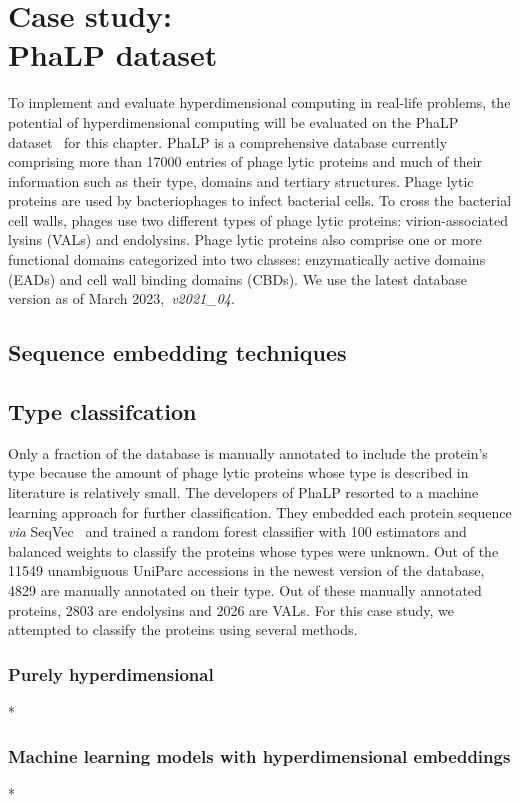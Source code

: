 \chapter[Case study: PhaLP dataset]{Case study: \\PhaLP dataset}
To implement and evaluate hyperdimensional computing in real-life problems, the potential of hyperdimensional computing will be evaluated on the PhaLP dataset~\cite{phalp} for this chapter. PhaLP is a comprehensive database currently comprising more than 17000 entries of phage lytic proteins and much of their information such as their type, domains and tertiary structures. Phage lytic proteins are used by bacteriophages to infect bacterial cells. To cross the bacterial cell walls, phages use two different types of phage lytic proteins: virion-associated lysins (VALs) and endolysins. Phage lytic proteins also comprise one or more functional domains categorized into two classes: enzymatically active domains (EADs) and cell wall binding domains (CBDs). We use the latest database version as of March 2023,~\textit{v2021\_04}.

\section{Sequence embedding techniques}


\section{Type classifcation}
Only a fraction of the database is manually annotated to include the protein's type because the amount of phage lytic proteins whose type is described in literature is relatively small. The developers of PhaLP resorted to a machine learning approach for further classification. They embedded each protein sequence \textit{via} SeqVec~\cite{seqvec} and trained a random forest classifier with 100 estimators and balanced weights to classify the proteins whose types were unknown. Out of the 11549 unambiguous UniParc accessions in the newest version of the database, 4829 are manually annotated on their type. Out of these manually annotated proteins, 2803 are endolysins and 2026 are VALs. For this case study, we attempted to classify the proteins using several methods.

\subsection{Purely hyperdimensional}*
\subsection{Machine learning models with hyperdimensional embeddings}*